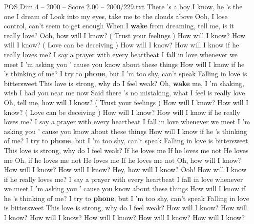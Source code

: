 \begin{textsample}{POS Dim 4 – 2000 – Score 2.00 – 2000/229.txt}  \label{ex:f4_pos_003}
There 's a boy I know, he 's the one I dream of Look into my eyes, take me to the clouds above Ooh, I lose control, can't seem to get enough When I \textbf{wake} from dreaming, tell me, is it really love?
Ooh, how will I know? ( Trust your feelings ) How will I know?
How will I know? ( Love can be deceiving ) How will I know?
How will I know if he really loves me?
I say a prayer with every heartbeat I fall in love whenever we meet I 'm asking you ' cause you know about these things How will I know if he 's thinking of me?
I try to \textbf{phone}, but I 'm too shy, can't speak Falling in love is bittersweet This love is strong, why do I feel weak?
Oh, \textbf{wake} me, I 'm shaking, wish I had you near me now Said there 's no mistaking, what I feel is really love Oh, tell me, how will I know? ( Trust your feelings ) How will I know?
How will I know? ( Love can be deceiving ) How will I know?
How will I know if he really loves me?
I say a prayer with every heartbeat I fall in love whenever we meet I 'm asking you ' cause you know about these things How will I know if he 's thinking of me?
I try to \textbf{phone}, but I 'm too shy, can't speak Falling in love is bittersweet This love is strong, why do I feel weak?
If he loves me If he loves me not He loves me Oh, if he loves me not He loves me If he loves me not Oh, how will I know?
How will I know?
How will I know?
Hey, how will I know?
Ooh!
How will I know if he really loves me?
I say a prayer with every heartbeat I fall in love whenever we meet I 'm asking you ' cause you know about these things How will I know if he 's thinking of me?
I try to \textbf{phone}, but I 'm too shy, can't speak Falling in love is bittersweet This love is strong, why do I feel weak?
How will I know?
How will I know?
How will I know?
How will I know?
How will I know?
How will I know?

\end{textsample}

